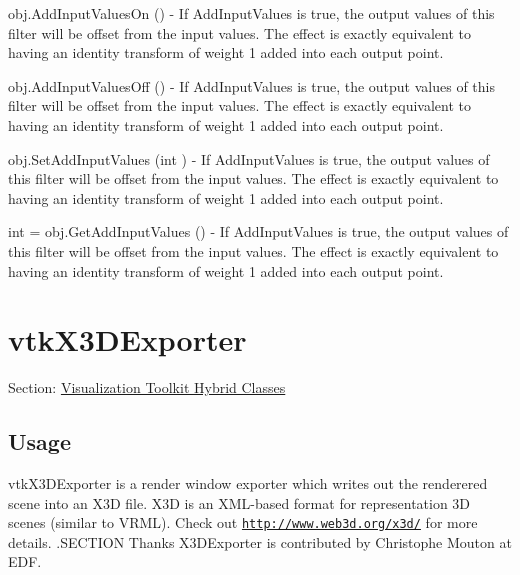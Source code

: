 \begin{DoxyItemize}
\item {\ttfamily obj.\-Add\-Input\-Values\-On ()} -\/ If Add\-Input\-Values is true, the output values of this filter will be offset from the input values. The effect is exactly equivalent to having an identity transform of weight 1 added into each output point.  
\item {\ttfamily obj.\-Add\-Input\-Values\-Off ()} -\/ If Add\-Input\-Values is true, the output values of this filter will be offset from the input values. The effect is exactly equivalent to having an identity transform of weight 1 added into each output point.  
\item {\ttfamily obj.\-Set\-Add\-Input\-Values (int )} -\/ If Add\-Input\-Values is true, the output values of this filter will be offset from the input values. The effect is exactly equivalent to having an identity transform of weight 1 added into each output point.  
\item {\ttfamily int = obj.\-Get\-Add\-Input\-Values ()} -\/ If Add\-Input\-Values is true, the output values of this filter will be offset from the input values. The effect is exactly equivalent to having an identity transform of weight 1 added into each output point.  
\end{DoxyItemize}\hypertarget{vtkhybrid_vtkx3dexporter}{}\section{vtk\-X3\-D\-Exporter}\label{vtkhybrid_vtkx3dexporter}
Section\-: \hyperlink{sec_vtkhybrid}{Visualization Toolkit Hybrid Classes} \hypertarget{vtkwidgets_vtkxyplotwidget_Usage}{}\subsection{Usage}\label{vtkwidgets_vtkxyplotwidget_Usage}
vtk\-X3\-D\-Exporter is a render window exporter which writes out the renderered scene into an X3\-D file. X3\-D is an X\-M\-L-\/based format for representation 3\-D scenes (similar to V\-R\-M\-L). Check out \href{http://www.web3d.org/x3d/}{\tt http\-://www.\-web3d.\-org/x3d/} for more details. .S\-E\-C\-T\-I\-O\-N Thanks X3\-D\-Exporter is contributed by Christophe Mouton at E\-D\-F.

